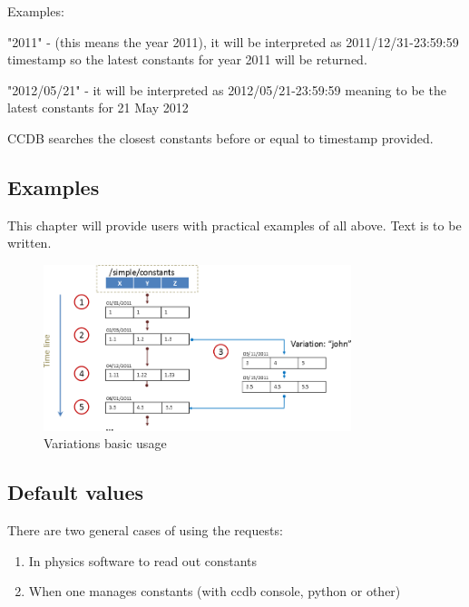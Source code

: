 \documentclass{article}
\begin{document}
Examples:

"2011" - (this means the year 2011), it will be interpreted as
2011/12/31-23:59:59 timestamp so the latest constants for year
2011 will be returned.


"2012/05/21" - it will be interpreted as 2012/05/21-23:59:59 meaning to be the
latest constants for 21 May 2012

CCDB searches the closest constants before or equal to timestamp provided.


\subsection{Examples}

This chapter will provide users with practical examples of all above.
Text is to be written.

\begin{figure}[h]
  \centering
  \includegraphics[width=0.8\textwidth]{pics/variations_example1}
  \caption{Variations basic usage}
\end{figure}




\subsection{Default values}

There are two general cases of using the requests:
\begin{enumerate}
  \item In physics software to read out constants
  \item When one manages constants (with ccdb console, python or other)
\end{enumerate}
\vspace{1 em}
\end{document}
